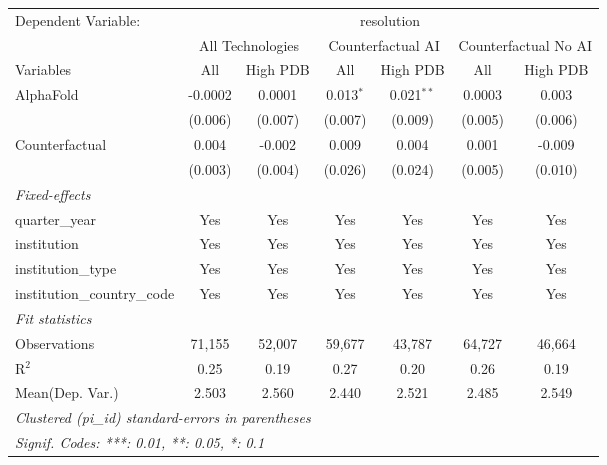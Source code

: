\begingroup
\centering
\begin{tabular}{lcccccc}
   \tabularnewline \midrule \midrule
   Dependent Variable: & \multicolumn{6}{c}{resolution}\\
 & \multicolumn{2}{c}{All Technologies} & \multicolumn{2}{c}{Counterfactual AI} & \multicolumn{2}{c}{Counterfactual No AI} \\
\cmidrule(lr){1-1}\cmidrule(lr){2-3} \cmidrule(lr){4-5} \cmidrule(lr){6-7}
Variables & \multicolumn{1}{c}{All} & \multicolumn{1}{c}{High PDB} & \multicolumn{1}{c}{All} & \multicolumn{1}{c}{High PDB} & \multicolumn{1}{c}{All} & \multicolumn{1}{c}{High PDB} \\
\cmidrule(lr){1-1}\cmidrule(lr){2-2} \cmidrule(lr){3-3} \cmidrule(lr){4-4} \cmidrule(lr){5-5} \cmidrule(lr){6-6} \cmidrule(lr){7-7}
   AlphaFold                    & -0.0002 & 0.0001  & 0.013$^{*}$ & 0.021$^{**}$ & 0.0003  & 0.003\\   
                                & (0.006) & (0.007) & (0.007)     & (0.009)      & (0.005) & (0.006)\\   
   Counterfactual               & 0.004   & -0.002  & 0.009       & 0.004        & 0.001   & -0.009\\   
                                & (0.003) & (0.004) & (0.026)     & (0.024)      & (0.005) & (0.010)\\   
   \midrule
   \emph{Fixed-effects}\\
   quarter\_year                & Yes     & Yes     & Yes         & Yes          & Yes     & Yes\\  
   institution                  & Yes     & Yes     & Yes         & Yes          & Yes     & Yes\\  
   institution\_type            & Yes     & Yes     & Yes         & Yes          & Yes     & Yes\\  
   institution\_country\_code   & Yes     & Yes     & Yes         & Yes          & Yes     & Yes\\  
   \midrule
   \emph{Fit statistics}\\
   Observations                 & 71,155  & 52,007  & 59,677      & 43,787       & 64,727  & 46,664\\  
   R$^2$                        & 0.25    & 0.19    & 0.27        & 0.20         & 0.26    & 0.19\\  
Mean(Dep. Var.) & 2.503 & 2.560 & 2.440 & 2.521 & 2.485 & 2.549 \\
   \midrule \midrule
   \multicolumn{7}{l}{\emph{Clustered (pi\_id) standard-errors in parentheses}}\\
   \multicolumn{7}{l}{\emph{Signif. Codes: ***: 0.01, **: 0.05, *: 0.1}}\\
\end{tabular}
\par\endgroup
